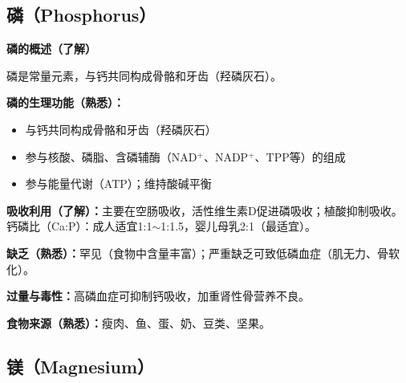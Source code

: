 \subsection{磷（Phosphorus）}

\begin{tipbox}
\textbf{磷的概述（了解）}

磷是常量元素，与钙共同构成骨骼和牙齿（羟磷灰石）。

\textbf{磷的生理功能（熟悉）：}
\begin{itemize}[leftmargin=*]
    \item 与钙共同构成骨骼和牙齿（羟磷灰石）
    \item 参与核酸、磷脂、含磷辅酶（NAD$^+$、NADP$^+$、TPP等）的组成
    \item 参与能量代谢（ATP）；维持酸碱平衡
\end{itemize}

\textbf{吸收利用（了解）：}主要在空肠吸收，活性维生素D促进磷吸收；植酸抑制吸收。钙磷比（Ca:P）：成人适宜1:1$\sim$1:1.5，婴儿母乳2:1（最适宜）。

\textbf{缺乏（熟悉）：}罕见（食物中含量丰富）；严重缺乏可致低磷血症（肌无力、骨软化）。

\textbf{过量与毒性：}高磷血症可抑制钙吸收，加重肾性骨营养不良。

\textbf{食物来源（熟悉）：}瘦肉、鱼、蛋、奶、豆类、坚果。
\end{tipbox}

\subsection{镁（Magnesium）}

